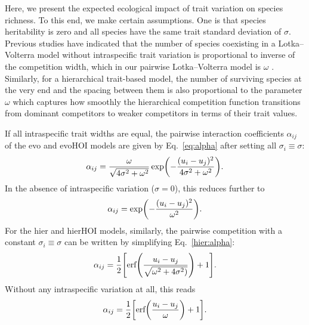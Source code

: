 \documentclass[10pt]{article}
\let\originalleft\left
\let\originalright\right
\renewcommand{\left}{\mathopen{}\mathclose\bgroup\originalleft}
\renewcommand{\right}{\aftergroup\egroup\originalright}
\begin{document}
Here, we present the expected ecological impact of trait variation on species richness. To this end, we make certain assumptions. One is that species heritability is zero and all species have the same trait standard deviation of $\sigma$. Previous studies have indicated that the number of species coexisting in a Lotka--Volterra model without intraspecific trait variation is proportional to inverse of the competition width, which in our pairwise Lotka--Volterra model is $\omega$ \citep{barabas_effect_2016,macarthur_limiting_1967}. Similarly, for a hierarchical trait-based model, the number of surviving species at the very end and the spacing between them is also proportional to the parameter $\omega$ which captures how smoothly the hierarchical competition function transitions from dominant competitors to weaker competitors in terms of their trait values. 

If all intraspecific trait widths are equal, the pairwise interaction coefficients $\alpha_{ij}$ of the evo and evoHOI models are given by Eq.~\ref{eq:alpha} after setting all $\sigma_i \equiv \sigma$:
\begin{equation}
  \alpha_{ij}
  = \frac{\omega}{\sqrt{4\sigma^2+\omega^2}}
  \exp\left(-\frac{(u_i-u_j)^2}{4\sigma^2 + \omega^2}\right) .
  \label{eq:alpha_itv}
\end{equation}
In the absence of intraspecific variation ($\sigma = 0$), this reduces further to
\begin{equation}
  \alpha_{ij}
  = \exp\left(-\frac{(u_i-u_j)^2}{\omega^2}\right) .
  \label{eq:alpha_noitv}
\end{equation}
For the hier and hierHOI models, similarly, the pairwise competition with a constant $\sigma_i \equiv \sigma$ can be written by simplifying Eq.~\ref{hier:alpha}:
\begin{equation}
  \alpha_{ij}
  = \frac{1}{2} \left[ \text{erf} \left(
  \frac{u_i-u_j}{\sqrt{\omega^2 + 4\sigma^2)}} \right) + 1\right] .
  \label{eq:alpha_itv_hier}
\end{equation}
Without any intraspecific variation at all, this reads
\begin{equation}
  \alpha_{ij}
  = \frac{1}{2} \left[ \text{erf} \left(
  \frac{u_i-u_j}{\omega} \right) + 1\right] .
  \label{eq:alpha_noitv_hier}
\end{equation}
\end{document}

